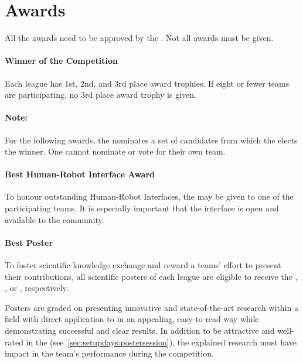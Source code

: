 \section{Awards}
\label{sec:introduction:awards}
All the awards need to be approved by the \RCF{}. Not all awards must be given.


\paragraph{Winner of the Competition}
\label{sec:introduction:winner}
Each league has 1st, 2nd, and 3rd place award trophies. If eight or fewer teams are participating, no 3rd place award trophy is given.

\newpage
\paragraph*{Note: } For the following awards, the \EC{} nominates a set of candidates from which the \TC{} elects the winner. One cannot nominate or vote for their own team.

\paragraph{Best Human-Robot Interface Award}
\label{sec:introduction:hriaward}
To honour outstanding Human-Robot Interfaces, the \HRIAward{} may be given to one of the participating teams. It is especially important that the interface is open and available to the \AtHome{} community.

\paragraph{Best Poster}
\label{sec:introduction:bestposter}
To foster scientific knowledge exchange and reward a teams' effort to present their contributions, all scientific posters of each league are eligible to receive the \DSPLPosterAward, \SSPLPosterAward, or \OPLPosterAward, respectively.

Posters are graded on presenting innovative and state-of-the-art research within a field with direct application to \RoboCup\AtHome{} in an appealing, easy-to-read way while demonstrating successful and clear results. In addition to be attractive and well-rated in the \PS{} (see~\ref{sec:setupdays:postersession}), the explained research must have impact in the team's performance during the competition.

